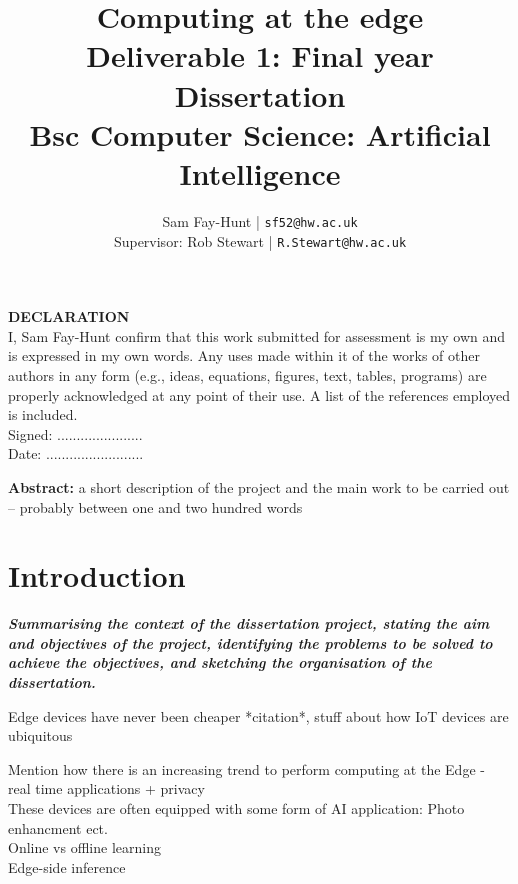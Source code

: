 \documentclass[11pt]{article}
\begin{document}
\title{%
	\bf Computing at the edge\\ 
	\large Deliverable 1: Final year Dissertation \\
	Bsc Computer Science: Artificial Intelligence}

\author{
	Sam Fay-Hunt | \texttt{sf52@hw.ac.uk}\\
	Supervisor: Rob Stewart | \texttt{R.Stewart@hw.ac.uk}
}

\maketitle

\pagebreak

\textbf{DECLARATION}\\
I, Sam Fay-Hunt confirm that this work submitted for assessment is my own and is expressed in
my own words. Any uses made within it of the works of other authors in any form (e.g., ideas,
equations, figures, text, tables, programs) are properly acknowledged at any point of their
use. A list of the references employed is included.\\
Signed: ......................\\
Date: .........................

\pagebreak

\textbf{Abstract:} a short description of the project and the main work to be carried out – probably
between one and two hundred words
\pagebreak

\tableofcontents
\thispagestyle{empty}
\pagebreak


\setcounter{page}{1}

\section{Introduction}
\emph{\textbf{Summarising the context of the dissertation project, stating the aim and objectives of the project, identifying the problems to be solved to achieve the objectives, and sketching
the organisation of the dissertation.}}

Edge devices have never been cheaper *citation*, stuff about how IoT devices are ubiquitous

Mention how there is an increasing trend to perform computing at the Edge - real time applications + privacy\\
These devices are often equipped with some form of AI application: Photo enhancment ect.\\
Online vs offline learning\\
Edge-side inference
\end{document}
